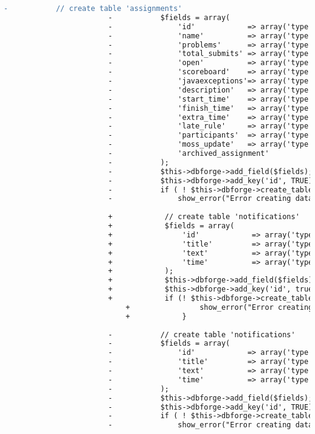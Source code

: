 \begin{lstlisting}[language=diff, caption=Perubahan pada kode Install.php]
						-			// create table 'assignments'
						-			$fields = array(
						-				'id'            => array('type' => 'INT', 'constraint' => 11, 'unsigned' => TRUE, 'auto_increment' => TRUE),
						-				'name'          => array('type' => 'VARCHAR', 'constraint' => 50, 'default' => ''),
						-				'problems'      => array('type' => 'SMALLINT', 'constraint' => 4, 'unsigned' => TRUE),
						-				'total_submits' => array('type' => 'INT', 'constraint' => 11, 'unsigned' => TRUE),
						-				'open'          => array('type' => 'TINYINT', 'constraint' => 1),
						-				'scoreboard'    => array('type' => 'TINYINT', 'constraint' => 1),
						-				'javaexceptions'=> array('type' => 'TINYINT', 'constraint' => 1),
						-				'description'   => array('type' => 'TEXT'),
						-				'start_time'    => array('type' => $DATETIME),
						-				'finish_time'   => array('type' => $DATETIME),
						-				'extra_time'    => array('type' => 'INT', 'constraint' => 11),
						-				'late_rule'     => array('type' => 'TEXT'),
						-				'participants'  => array('type' => 'TEXT'),
						-				'moss_update'   => array('type' => 'VARCHAR', 'constraint' => 30, 'default' => 'Never'),
						-				'archived_assignment'          => array('type' => 'TINYINT', 'constraint' => 1),
						-			);
						-			$this->dbforge->add_field($fields);
						-			$this->dbforge->add_key('id', TRUE); // PRIMARY KEY
						-			if ( ! $this->dbforge->create_table('assignments', TRUE))
						-				show_error("Error creating database table ".$this->db->dbprefix('assignments'));
						
						+            // create table 'notifications'
						+            $fields = array(
						+                'id'            => array('type' => 'INT', 'constraint' => 11, 'unsigned' => true, 'auto_increment' => true),
						+                'title'         => array('type' => 'VARCHAR', 'constraint' => 200, 'default' => ''),
						+                'text'          => array('type' => 'TEXT'),
						+                'time'          => array('type' => $DATETIME),
						+            );
						+            $this->dbforge->add_field($fields);
						+            $this->dbforge->add_key('id', true); // PRIMARY KEY
						+            if (! $this->dbforge->create_table('notifications', true)) {
							+                show_error("Error creating database table ".$this->db->dbprefix('notifications'));
							+            }
						
						-			// create table 'notifications'
						-			$fields = array(
						-				'id'            => array('type' => 'INT', 'constraint' => 11, 'unsigned' => TRUE, 'auto_increment' => TRUE),
						-				'title'         => array('type' => 'VARCHAR', 'constraint' => 200, 'default' => ''),
						-				'text'          => array('type' => 'TEXT'),
						-				'time'          => array('type' => $DATETIME),
						-			);
						-			$this->dbforge->add_field($fields);
						-			$this->dbforge->add_key('id', TRUE); // PRIMARY KEY
						-			if ( ! $this->dbforge->create_table('notifications', TRUE))
						-				show_error("Error creating database table ".$this->db->dbprefix('notifications'));
						

\end{lstlisting}
